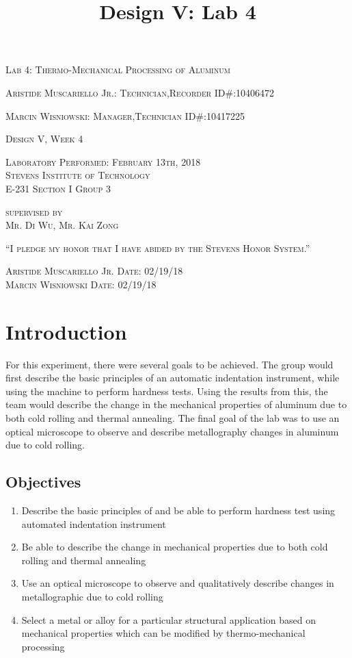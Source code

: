 \documentclass{article}
\begin{document}
\title{Design V: Lab 4}
\begin{titlepage}
    \centering
	{\scshape\LARGE Lab 4: Thermo-Mechanical Processing of Aluminum\par}
	\vspace{1cm}
	{\scshape Aristide Muscariello Jr.: Technician,Recorder \hfill ID\#:10406472 \par}
	{\scshape Marcin Wisniowski: Manager,Technician \hfill ID\#:10417225\par}
	\vfill
	{\scshape Design V, Week 4\par}
	\vspace{.5cm}
	{\scshape Laboratory Performed: February 13th, 2018\\Stevens Institute of Technology\\E-231 Section I Group 3\par}
	\vspace{.5cm}
	{\scshape supervised by\\Mr. Di Wu, Mr. Kai Zong \par}
    \vfill
	{\scshape“I pledge my honor that I have abided by the Stevens Honor System.”\par}
	\vspace{.5cm}
	{\scshape Aristide Muscariello Jr. \hfill Date: 02/19/18\\Marcin Wisniowski \hfill Date: 02/19/18\\}
	\vspace{3cm}
\end{titlepage}

\section{Introduction}
For this experiment, there were several goals to be achieved.  The group would first describe the basic principles of an automatic indentation instrument, while using the machine to perform hardness tests. Using the results from this, the team would describe the change in the mechanical properties of aluminum due to both cold rolling and thermal annealing. The final goal of the lab was to use an optical microscope to observe and describe metallography changes in aluminum due to cold rolling.

\subsection{Objectives}
\begin{enumerate}
\item Describe the  basic principles of and be able to perform hardness test using automated indentation instrument
\item Be able to describe the change in mechanical properties due to both cold rolling and thermal annealing
\item Use an optical microscope to observe and qualitatively describe changes in metallographic due to cold rolling
\item Select a metal or alloy for a particular structural application based on mechanical properties which can be modified by thermo-mechanical processing
\end{enumerate}
\end{document}
